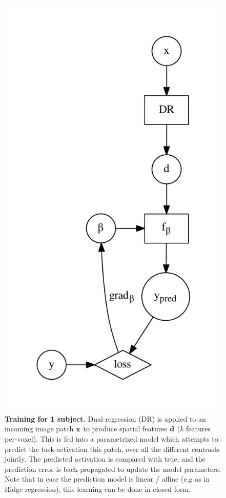\begin{figure}
  \includegraphics[width=1\linewidth]{figures/rfmri2tfmri.pdf}
  \caption{\textbf{Training for 1 subject.} Dual-regression (DR) is applied to an incoming image patch $\mathbf{x}$ to produce spatial features $\mathbf{d}$ ($k$ features per-voxel). This is fed into a parametrized model which attempts to predict the task-activation this patch, over all the different contrasts jointly. The predicted activation is compared with true, and the prediction error is back-propagated to update the model parameters. Note that in case the prediction model is linear / affine (e.g as in Ridge regression), this learning can be done in closed form.}
\end{figure}

